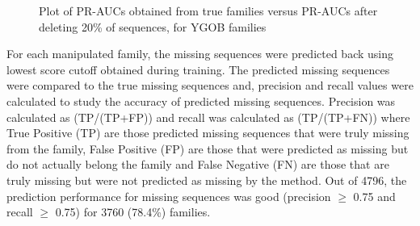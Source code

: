 \documentclass{article}
\begin{document}
		\begin{figure}
			\caption{Plot of PR-AUCs obtained from true families versus PR-AUCs after deleting 20\% of sequences, for YGOB families}
			\label{fig:scatter_pr-auc_true_vs_pr-auc_delete_ygob}
		\end{figure}
	
		For each manipulated family, the missing sequences were predicted 
		back using lowest score cutoff obtained during training. The predicted missing sequences were compared to the true missing sequences and, precision and recall values were calculated to study the accuracy of predicted missing sequences. Precision was calculated as (TP/(TP+FP)) and recall was calculated as (TP/(TP+FN)) where True Positive (TP) are those predicted missing sequences that were truly missing from the family, False Positive (FP) are those that were predicted as missing but do not actually belong the family and False Negative (FN) are those that are truly missing but were not predicted as missing by the method. Out of 4796, the prediction performance for missing sequences was good (precision $\geq$ 0.75 and recall $\geq$ 0.75) for 3760 (78.4\%) families.
		
\end{document}
